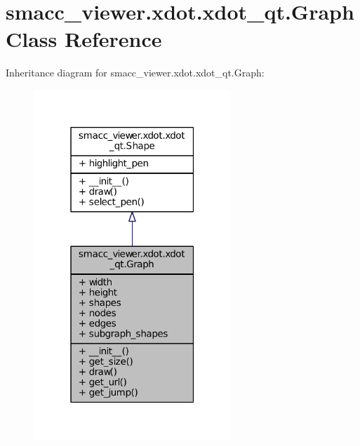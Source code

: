\hypertarget{classsmacc__viewer_1_1xdot_1_1xdot__qt_1_1Graph}{}\section{smacc\+\_\+viewer.\+xdot.\+xdot\+\_\+qt.\+Graph Class Reference}
\label{classsmacc__viewer_1_1xdot_1_1xdot__qt_1_1Graph}


Inheritance diagram for smacc\+\_\+viewer.\+xdot.\+xdot\+\_\+qt.\+Graph\+:
\nopagebreak
\begin{figure}[H]
\begin{center}
\leavevmode
\includegraphics[width=211pt]{classsmacc__viewer_1_1xdot_1_1xdot__qt_1_1Graph__inherit__graph}
\end{center}
\end{figure}


